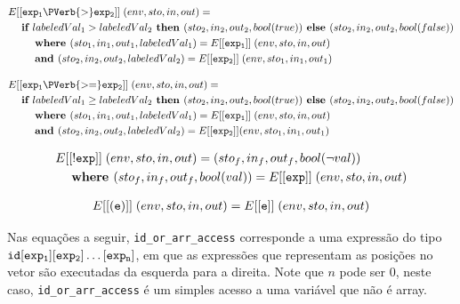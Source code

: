 \documentclass[12pt]{article}
\begin{document}
\begin{align*}
&E[[{\tt exp_1 \PVerb{ > } exp_2}]]\; (env,sto,in,out) = \\ 
&\hspace{3ex}\textbf{if } labeledVal_1 > labeledVal_2 \textbf{ then } (sto_2,in_2,out_2,bool(true)) \textbf{ else } (sto_2,in_2,out_2,bool(false)) \\
&\hspace{6ex}\textbf{where } (sto_1,in_1,out_1,labeledVal_1) = E[[{\tt exp_1}]]\;(env,sto,in,out) \\
&\hspace{6ex}\textbf{and }(sto_2,in_2,out_2,labeledVal_2) = E[[{\tt exp_2}]]\; (env,sto_1,in_1,out_1) \\
\end{align*}


\begin{align*}
&E[[{\tt exp_1 \PVerb{ >= } exp_2}]]\; (env,sto,in,out) = \\ 
&\hspace{3ex}\textbf{if } labeledVal_1 \geq labeledVal_2 \textbf{ then } (sto_2,in_2,out_2,bool(true)) \textbf{ else } (sto_2,in_2,out_2,bool(false)) \\
&\hspace{6ex}\textbf{where } (sto_1,in_1,out_1,labeledVal_1) = E[[{\tt exp_1}]]\;(env,sto,in,out) \\
&\hspace{6ex}\textbf{and }(sto_2,in_2,out_2,labeledVal_2) = E[[{\tt exp_2}]] (env,sto_1,in_1,out_1) \\
\end{align*}

\begin{align*}
&E[[{\tt !exp}]]\; (env,sto,in,out) = (sto_f,in_f,out_f,bool(\neg val)) \\
&\hspace{3ex}\textbf{where } (sto_f,in_f,out_f,bool(val)) = E[[{\tt exp}]]\; (env,sto,in,out) \\
\end{align*}

\begin{align*}
&E[[{\tt (e)}]] \;(env,sto,in,out) = E[[{\tt e}]]\; (env,sto,in,out) \\
\end{align*}

Nas equações a seguir, {\tt id\_or\_arr\_access} corresponde a uma expressão do tipo ${\tt id[exp_1][exp_2] \ldots [exp_n]}$, em que as expressões que representam as posições no vetor são executadas da esquerda para a direita. Note que $n$ pode ser 0, neste caso, {\tt id\_or\_arr\_access} é um simples acesso a uma variável que não é array.
\end{document}
